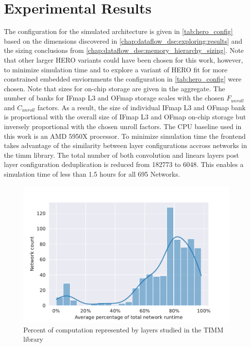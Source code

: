 \section{Experimental Results}
\label{chap:hero:results}

The configuration for the simulated architecture is given in
\autoref{tab:hero_config} based on the dimensions discovered in
\autoref{chap:dataflow_dse:exploring:results} and the sizing conclusions from
\autoref{chap:dataflow_dse:memory_hierarchy_sizing}. Note that other larger HERO
variants could have been chosen for this work, however, to minimize simulation
time and to explore a variant of HERO fit for more constrained embedded
enviornments the configuration in \autoref{tab:hero_config} were chosen.   
Note that sizes for on-chip
storage are given in the aggregate. The number of banks for IFmap L3 and OFmap
storage scales with the chosen $F_{unroll}$ and $C_{unroll}$ factors. As a
result, the size of individual IFmap L3 and OFmap bank is proportional with the
overall size of IFmap L3 and OFmap on-chip storage but inversely proportional
with the chosen unroll factors. The CPU baseline used in this work is an AMD
5950X processor. To minimize simulation time the frontend takes advantage of the
similarity between layer configurations accross networks in the timm library.
The total number of both convolution and linears layers post layer configuration
deduplication is reduced from 182773 to 6048. This enables a simulation time of
less than 1.5 hours for all 695 Networks.

\begin{figure}[ht]
    \centering
    \includegraphics[scale=0.58]{Plots/overview/percent.pdf}
    \caption{Percent of computation represented by layers studied in the TIMM library}
    \label{fig:percent_of_compute}
\end{figure}

